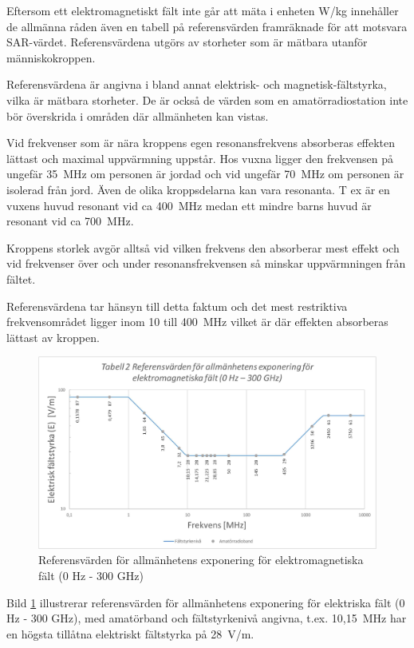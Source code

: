 Eftersom ett elektromagnetiskt fält inte går att mäta i enheten W/kg
innehåller de allmänna råden även en tabell på referensvärden
framräknade för att motsvara SAR-värdet. Referensvärdena utgörs av
storheter som är mätbara utanför människokroppen.

Referensvärdena är angivna i bland annat elektrisk- och
magnetisk-fältstyrka, vilka är mätbara storheter. De är också de
värden som en amatörradiostation inte bör överskrida i områden där
allmänheten kan vistas.

Vid frekvenser som är nära kroppens egen resonansfrekvens absorberas
effekten lättast och maximal uppvärmning uppstår. Hos vuxna ligger
den frekvensen på ungefär 35~MHz om personen är jordad och vid
ungefär 70~MHz om personen är isolerad från jord. Även de olika
kroppsdelarna kan vara resonanta. T ex är en vuxens huvud resonant
vid ca 400~MHz medan ett mindre barns huvud är resonant vid ca 700~MHz.

Kroppens storlek avgör alltså vid vilken frekvens den absorberar mest
effekt och vid frekvenser över och under resonansfrekvensen så minskar
uppvärmningen från fältet.

Referensvärdena tar hänsyn till detta faktum och det mest restriktiva
frekvensområdet ligger inom 10 till 400~MHz vilket är där effekten
absorberas lättast av kroppen.

\begin{figure}[h]
\begin{center}
\includegraphics[width=14cm]{images/emfbild-000}
\caption{Referensvärden för allmänhetens exponering för elektromagnetiska fält (0 Hz - 300 GHz)}
\label{fig:emf1}
\end{center}
\end{figure}

Bild \ref{fig:emf1} illustrerar referensvärden för allmänhetens
exponering för elektriska fält (0 Hz - 300 GHz), med amatörband
och fältstyrkenivå angivna, t.ex. 10,15~MHz har en högsta tillåtna
elektriskt fältstyrka på 28~V/m.

